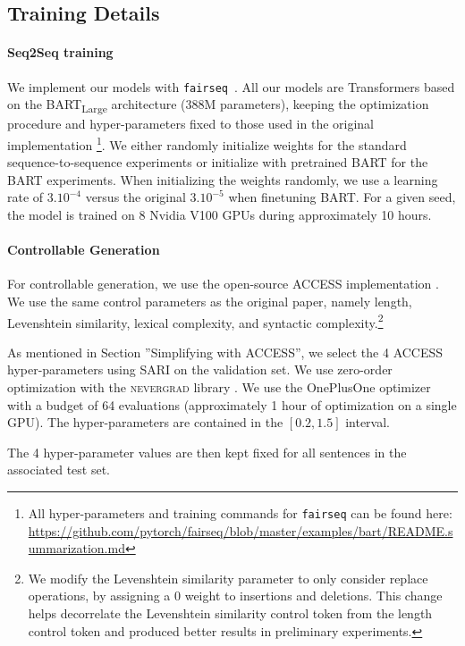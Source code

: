 \documentclass[11pt]{article}
\newcommand{\bart}{\textsc{BART}\xspace}
\newcommand{\access}{\mbox{\textsc{ACCESS}}\xspace}
\begin{document}
\subsection{Training Details}\label{subsection:training_details}
\paragraph{Seq2Seq training}
We implement our models with \texttt{fairseq}~\cite{ott2019fairseq}.
All our models are Transformers \cite{vaswani2017attention} based on the \bart\textsubscript{Large} architecture (388M parameters), keeping the optimization procedure and hyper-parameters fixed to those used in the original implementation \cite{lewis2019bart}\footnote{All hyper-parameters and training commands for \texttt{fairseq} can be found here: \url{https://github.com/pytorch/fairseq/blob/master/examples/bart/README.summarization.md}}.
We either randomly initialize weights for the standard sequence-to-sequence experiments or initialize with pretrained \bart for the \bart experiments. When initializing the weights randomly, we use a learning rate of $3.10^{-4}$ versus the original $3.10^{-5}$ when finetuning \bart. 
For a given seed, the model is trained on 8 Nvidia V100 GPUs during approximately 10 hours.

\paragraph{Controllable Generation}
For controllable generation, we use the open-source \access implementation \cite{martin2019reference}. We use the same control parameters as the original paper, namely length, Levenshtein similarity, lexical complexity, and syntactic complexity.\footnote{We modify the Levenshtein similarity parameter to only consider replace operations, by assigning a 0 weight to insertions and deletions. This change helps decorrelate the Levenshtein similarity control token from the length control token and produced better results in preliminary experiments.}

As mentioned in Section ''Simplifying with \access'', we select the 4 \access hyper-parameters using SARI on the validation set.
We use zero-order optimization with the \textsc{nevergrad} library \cite{nevergrad}. We use the OnePlusOne optimizer with a budget of 64 evaluations (approximately 1 hour of optimization on a single GPU).
The hyper-parameters are contained in the $[0.2, 1.5]$ interval.

The 4 hyper-parameter values are then kept fixed for all sentences in the associated test set.
\end{document}
